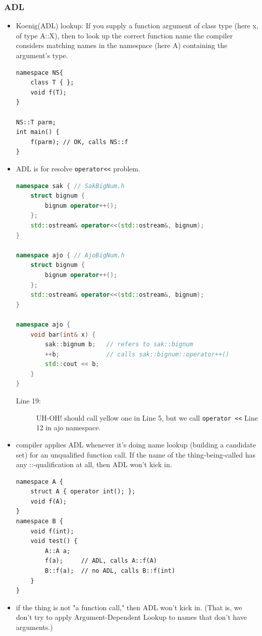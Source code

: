 \documentclass[a4paper,11pt,twoside]{book}
\begin{document}
\subsubsection{ADL}
\begin{itemize}
	\item Koenig(ADL) lookup: If you supply a function argument of class type (here x, of type A::X), then to look up the correct function name the compiler considers matching names in the namespace (here A) containing the argument's type.
	
\begin{lstlisting}[numbers=none]
namespace NS{
	class T { };
	void f(T);
}
	
NS::T parm;
int main() {
	f(parm); // OK, calls NS::f
}
\end{lstlisting}
	
\item ADL is for resolve \texttt{operator<<} problem.
\begin{lstlisting}[frame=single, language=c++]
namespace sak { // SakBigNum.h
	struct bignum {
		bignum operator++();
	};
	std::ostream& operator<<(std::ostream&, bignum); 
}

namespace ajo { // AjoBigNum.h
	struct bignum {
		bignum operator++();
	};
	std::ostream& operator<<(std::ostream&, bignum);
}
	
namespace ajo {
	void bar(int& x) {
		sak::bignum b;   // refers to sak::bignum
		++b;             // calls sak::bignum::operator++()
		std::cout << b;  
	}
}
\end{lstlisting}
\begin{description}
	\item[Line 19:] UH-OH! should call yellow one in Line 5, but we call \texttt{operator <<} Line 12 in ajo namespace.
\end{description}
	
	\item compiler applies ADL whenever it's doing name lookup (building a candidate set) for an unqualified function call. If the name of the thing-being-called has any ::-qualification at all, then ADL won't kick in.
	
\begin{lstlisting}[numbers=none]
namespace A {
	struct A { operator int(); };
	void f(A);
}
namespace B {
	void f(int);
	void test() {
		A::A a;
		f(a);     // ADL, calls A::f(A)
		B::f(a);  // no ADL, calls B::f(int)
	}
}
	\end{lstlisting}
	
	\item  if the thing is not "a function call," then ADL won't kick in. (That is, we don't try to apply Argument-Dependent Lookup to names that don't have arguments.) 
	

\end{itemize}
\end{document}
